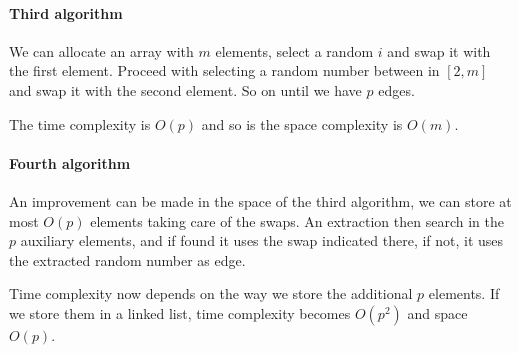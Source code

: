 \paragraph{Third algorithm}
We can allocate an array with $m$ elements, select a random $i$ and swap it 
with the first element. 
Proceed with selecting a random number between in $[2,m]$ and swap it with the second 
element. So on until we have $p$ edges.

The time complexity is $O(p)$ and so is the space complexity is $O(m)$.

\paragraph{Fourth algorithm}
An improvement can be made in the space of the third algorithm, we can store 
at most $O(p)$ elements taking care of the swaps. An extraction then search in the 
$p$ auxiliary elements, and if found it uses the swap indicated there, if not, it 
uses the extracted random number as edge.

Time complexity now depends on the way we store the additional $p$ elements. 
If we store them in a linked list, time complexity becomes $O(p^2)$ and space $O(p)$.

